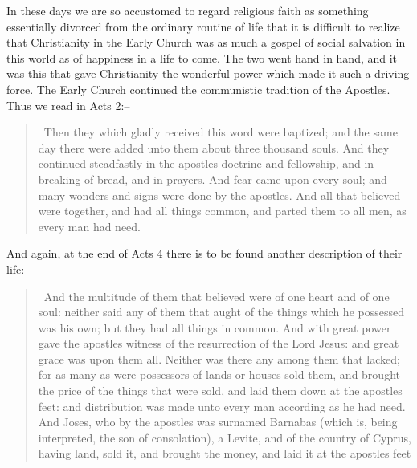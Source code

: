 \documentclass{book}
\begin{document}
In these days we are so accustomed to regard religious faith as something essentially divorced from the ordinary routine of life that it is difficult to realize that Christianity in the Early Church was as much a gospel of social salvation in this world as of happiness in a life to come. The two went hand in hand, and it was this that gave Christianity the wonderful power which made it such a driving force. The Early Church continued the communistic tradition of the Apostles. Thus we read in Acts 2:–

\begin{quotation}\
	Then they which gladly received this word were baptized; and the same day there were added unto them about three thousand souls. And they continued steadfastly in the apostles doctrine and fellowship, and in breaking of bread, and in prayers. And fear came upon every soul; and many wonders and signs were done by the apostles. And all that believed were together, and had all things common, and parted them to all men, as every man had need.
\end{quotation}

And again, at the end of Acts 4 there is to be found another description of their life:–

\begin{quotation}\
	And the multitude of them that believed were of one heart and of one soul: neither said any of them that aught of the things which he possessed was his own; but they had all things in common. And with great power gave the apostles witness of the resurrection of the Lord Jesus: and great grace was upon them all. Neither was there any among them that lacked; for as many as were possessors of lands or houses sold them, and brought the price of the things that were sold, and laid them down at the apostles feet: and distribution was made unto every man according as he had need. And Joses, who by the apostles was surnamed Barnabas (which is, being interpreted, the son of consolation), a Levite, and of the country of Cyprus, having land, sold it, and brought the money, and laid it at the apostles feet
\end{quotation}
\end{document}
